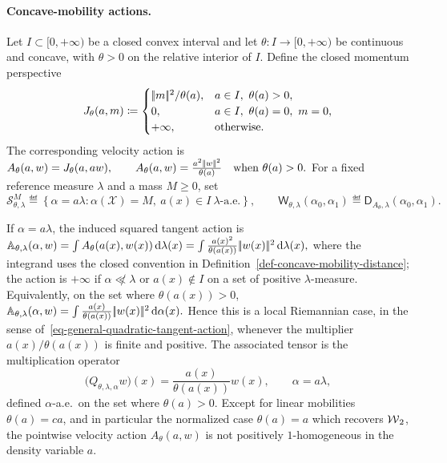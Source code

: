 \paragraph{Concave-mobility actions.}
\begin{defn}\label{def-concave-mobility-distance}
Let \(I\subset[0,+\infty)\) be a closed convex interval and let \(\theta:I\to[0,+\infty)\) be continuous and concave, with $\theta>0$ on the relative interior of $I$. Define the closed momentum perspective
\[
J_\theta(a,m)
\coloneqq
\begin{cases}
|\!| m |\!|^2/\theta(a), & a\in I,\ \theta(a)>0,\\
0, & a\in I,\ \theta(a)=0,\ m=0,\\
+\infty, & \text{otherwise}.
\end{cases}
\]
The corresponding velocity action is \(A_\theta(a,w)=J_\theta(a,aw), \qquad A_\theta(a,w)=\frac{a^2|\!| w |\!|^2}{\theta(a)}\quad\text{when }\theta(a)>0.\)
For a fixed reference measure $\lambda$ and a mass $M\geq0$, set
\[
\mathcal S_{\theta,\lambda}^M
\eqdef
\left\{\alpha=a\lambda:\alpha(\mathcal X)=M,\ a(x)\in I\ \lambda\text{-a.e.}\right\},
\qquad
\mathsf W_{\theta,\lambda}(\alpha_0,\alpha_1)
\eqdef
\mathsf D_{A_\theta,\lambda}(\alpha_0,\alpha_1).
\]
\end{defn}
If \(\alpha=a\lambda\), the induced squared tangent action is \(\mathbb A_{\theta,\lambda}(\alpha,w) = \int A_\theta(a(x),w(x))\,\mathrm{d}\lambda(x) = \int \frac{a(x)^2}{\theta(a(x))}|\!| w(x) |\!|^2\,\mathrm{d}\lambda(x),\)
where the integrand uses the closed convention in Definition~\ref{def-concave-mobility-distance}; the action is $+\infty$ if $\alpha\not\ll\lambda$ or $a(x)\notin I$ on a set of positive $\lambda$-measure. Equivalently, on the set where \(\theta(a(x))>0\),
\(\mathbb A_{\theta,\lambda}(\alpha,w) = \int \frac{a(x)}{\theta(a(x))}|\!| w(x) |\!|^2\,\mathrm{d}\alpha(x).\)
Hence this is a local Riemannian case, in the sense of~\eqref{eq-general-quadratic-tangent-action}, whenever the multiplier \(a(x)/\theta(a(x))\) is finite and positive. The associated tensor is the multiplication operator
\begin{equation}\label{eq-concave-mobility-q-alpha}
\big(Q_{\theta,\lambda,\alpha}w\big)(x)
=
\frac{a(x)}{\theta(a(x))}w(x),
\qquad
\alpha=a\lambda,
\end{equation}
defined \(\alpha\)-a.e.\ on the set where \(\theta(a)>0\). Except for linear mobilities \(\theta(a)=ca\), and in particular the normalized case \(\theta(a)=a\) which recovers \(\operatorname{\mathcal{W}}_2\), the pointwise velocity action \(A_\theta(a,w)\) is not positively \(1\)-homogeneous in the density variable \(a\).

